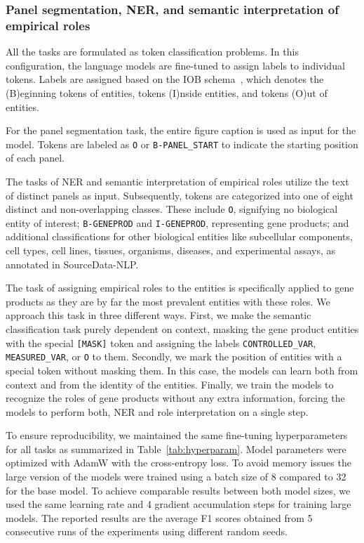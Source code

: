 \documentclass{bioinfo}
\begin{document}
\begin{methods}
\subsubsection{Panel segmentation, NER, and semantic interpretation of empirical roles}\label{sec:token-class-experiment}

All the tasks are formulated as token classification problems. In this configuration, the language models are fine-tuned to assign labels to individual tokens. Labels are assigned based on the IOB schema~\citep{biotagging}, which denotes the (B)eginning tokens of entities, tokens (I)nside entities, and tokens (O)ut of entities.

For the panel segmentation task, the entire figure caption is used as input for the model. Tokens are labeled as {\verb'O'} or {\verb'B-PANEL_START'} to indicate the starting position of each panel.

The tasks of NER and semantic interpretation of empirical roles utilize the text of distinct panels as input. Subsequently, tokens are categorized into one of eight distinct and non-overlapping classes. These include \verb'O', signifying no biological entity of interest; \verb'B-GENEPROD' and \verb'I-GENEPROD', representing gene products; and additional classifications for other biological entities like subcellular components, cell types, cell lines, tissues, organisms, diseases, and experimental assays, as annotated in SourceData-NLP.

The task of assigning empirical roles to the entities is specifically applied to gene products as they are by far the most prevalent entities with these roles. We approach this task in three different ways. First, we make the semantic classification task purely dependent on context, masking the gene product entities with the special {\verb'[MASK]'} token and assigning the labels {\verb'CONTROLLED_VAR'}, {\verb'MEASURED_VAR'}, or {\verb'O'} to them. Secondly, we mark the position of entities with a special token without masking them. In this case, the models can learn both from context and from the identity of the entities. Finally, we train the models to recognize the roles of gene products without any extra information, forcing the models to perform both, NER and role interpretation on a single step.

To ensure reproducibility, we maintained the same fine-tuning hyperparameters for all tasks as summarized in Table~\ref{tab:hyperparam}.  Model parameters were optimized with AdamW with the cross-entropy loss. To avoid memory issues the large version of the models were trained using a batch size of 8 compared to 32 for the base model. To achieve comparable results between both model sizes, we used the same learning rate and 4 gradient accumulation steps for training large models. The reported results are the average F1 scores obtained from 5 consecutive runs of the experiments using different random seeds.


\end{methods}
\end{document}
